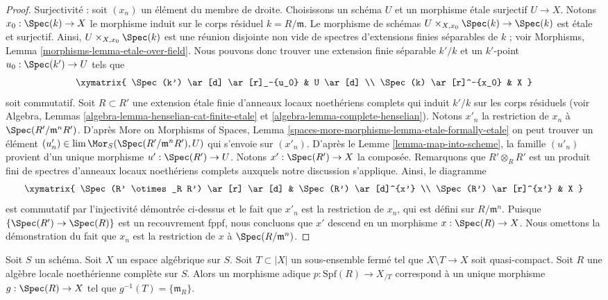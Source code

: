 \begin{proof}
\medskip\noindent
Surjectivité : soit $(x_n)$ un élément du membre de droite.
Choisissons un schéma $U$ et un morphisme \'etale surjectif $U \to X$. 
Notons $x_0 : \Spec(k) \to X$ le morphisme induit sur le corps résiduel
$k = R/\mathfrak m$. Le morphisme de schémas
$U \times_{X, x_0} \Spec(k) \to \Spec(k)$ est \'etale et surjectif.
Ainsi, $U \times_{X, x_0} \Spec(k)$ est une réunion disjointe non vide de spectres
d'extensions finies séparables de $k$ ; voir
Morphisms, Lemma \ref{morphisms-lemma-etale-over-field}.
Nous pouvons donc trouver une extension finie séparable $k'/k$
et un $k'$-point $u_0 : \Spec(k') \to U$ tels que
$$
\xymatrix{
\Spec(k') \ar[d] \ar[r]_-{u_0} & U \ar[d] \\
\Spec(k) \ar[r]^-{x_0} & X
}
$$
soit commutatif. Soit $R \subset R'$ une extension \'etale finie d'anneaux locaux
noethériens complets qui induit $k'/k$ sur les corps résiduels
(voir Algebra, Lemmas \ref{algebra-lemma-henselian-cat-finite-etale} et
\ref{algebra-lemma-complete-henselian}). Notons $x'_n$ la restriction
de $x_n$ à $\Spec(R'/\mathfrak m^nR')$. D'après
More on Morphisms of Spaces, Lemma
\ref{spaces-more-morphisms-lemma-etale-formally-etale}
on peut trouver un élément
$(u'_n) \in \lim \Mor_S(\Spec(R'/\mathfrak m^nR'), U)$
qui s'envoie sur $(x'_n)$. D'après le Lemme \ref{lemma-map-into-scheme},
la famille $(u'_n)$ provient d'un unique
morphisme $u' : \Spec(R') \to U$. Notons $x' : \Spec(R') \to X$ la
composée. Remarquons que $R' \otimes_R R'$ est un produit fini de spectres d'anneaux
locaux noethériens complets auxquels notre discussion s'applique.
Ainsi, le diagramme
$$
\xymatrix{
\Spec(R' \otimes_R R') \ar[r] \ar[d] & \Spec(R') \ar[d]^{x'} \\
\Spec(R') \ar[r]^{x'} & X
}
$$
est commutatif par l'injectivité démontrée ci-dessus et le fait que
$x'_n$ est la restriction de $x_n$, qui est défini sur $R/\mathfrak m^n$.
Puisque $\{\Spec(R') \to \Spec(R)\}$ est un recouvrement fppf, nous concluons
que $x'$ descend en un morphisme $x : \Spec(R) \to X$.
Nous omettons la démonstration du fait que $x_n$ est la restriction de $x$ à
$\Spec(R/\mathfrak m^n)$.
\end{proof}

\begin{lemma}
\label{lemma-adic-into-completion}
Soit $S$ un schéma. Soit $X$ un espace algébrique sur $S$.
Soit $T \subset |X|$ un sous-ensemble fermé tel que
$X \setminus T \to X$ soit quasi-compact. Soit $R$ une algèbre locale
noethérienne complète sur $S$. Alors un morphisme adique $p : \text{Spf}(R) \to X_{/T}$
correspond à un unique morphisme $g : \Spec(R) \to X$ tel
que $g^{-1}(T) = \{\mathfrak m_R\}$. 
\end{lemma}


